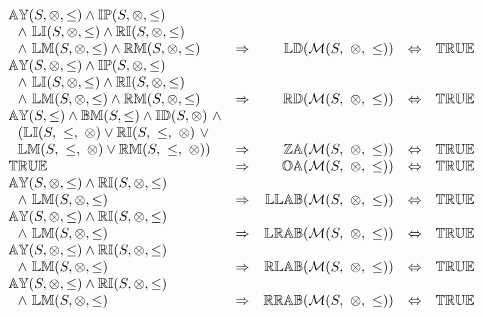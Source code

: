 \[
\begin{array}{lcrcl} 
\propname{AY}(S,\otimes,\leq) \wedge \propname{IP}(S,\otimes,\leq)  \\
\ \ \wedge \ \propname{LI}(S,\otimes,\leq) \wedge \propname{RI}(S,\otimes,\leq)  \\
\ \ \wedge \ \propname{LM}(S,\otimes,\leq) \wedge \propname{RM}(S,\otimes,\leq)
	& \Rightarrow
	& \propname{LD}(\mathcal{M}(S,\ \otimes,\ \leq)) 
    & \Leftrightarrow 
    & \propname{TRUE}
    \\ 
\propname{AY}(S,\otimes,\leq) \wedge \propname{IP}(S,\otimes,\leq)  \\
\ \ \wedge \ \propname{LI}(S,\otimes,\leq) \wedge \propname{RI}(S,\otimes,\leq)  \\
\ \ \wedge \ \propname{LM}(S,\otimes,\leq) \wedge \propname{RM}(S,\otimes,\leq)
	& \Rightarrow
	& \propname{RD}(\mathcal{M}(S,\ \otimes,\ \leq)) 
    & \Leftrightarrow 
    & \propname{TRUE}
    \\ 
\propname{AY}(S,\leq) \wedge \propname{BM}(S,\leq) \wedge \propname{ID}(S,\otimes) \ \wedge \\
\ \ (\propname{LI}(S,\ \leq,\ \otimes) \vee \propname{RI}(S,\ \leq,\ \otimes) \ \vee \\
\ \ \propname{LM}(S,\ \leq,\ \otimes) \vee \propname{RM}(S,\ \leq,\ \otimes))
	& \Rightarrow
	& \propname{ZA}(\mathcal{M}(S,\ \otimes,\ \leq)) 
    & \Leftrightarrow 
    & \propname{TRUE}
    \\
\propname{TRUE}
	& \Rightarrow
	& \propname{OA}(\mathcal{M}(S,\ \otimes,\ \leq)) 
    & \Leftrightarrow 
    & \propname{TRUE}
    \\  
\propname{AY}(S,\otimes,\leq) \wedge \propname{RI}(S,\otimes,\leq) \\ 
\ \ \wedge \ \propname{LM}(S,\otimes,\leq)
	& \Rightarrow
	& \propname{LLAB}(\mathcal{M}(S,\ \otimes,\ \leq)) 
    & \Leftrightarrow 
    & \propname{TRUE}
    \\
\propname{AY}(S,\otimes,\leq) \wedge \propname{RI}(S,\otimes,\leq) \\ 
\ \ \wedge \ \propname{LM}(S,\otimes,\leq)
	& \Rightarrow
	& \propname{LRAB}(\mathcal{M}(S,\ \otimes,\ \leq)) 
    & \Leftrightarrow 
    & \propname{TRUE}
    \\
\propname{AY}(S,\otimes,\leq) \wedge \propname{RI}(S,\otimes,\leq) \\ 
\ \ \wedge \ \propname{LM}(S,\otimes,\leq)
	& \Rightarrow
	& \propname{RLAB}(\mathcal{M}(S,\ \otimes,\ \leq)) 
    & \Leftrightarrow 
    & \propname{TRUE}
    \\
\propname{AY}(S,\otimes,\leq) \wedge \propname{RI}(S,\otimes,\leq) \\ 
\ \ \wedge \ \propname{LM}(S,\otimes,\leq)
	& \Rightarrow
	& \propname{RRAB}(\mathcal{M}(S,\ \otimes,\ \leq)) 
    & \Leftrightarrow 
    & \propname{TRUE}
    \\
\end{array} 
\] 

